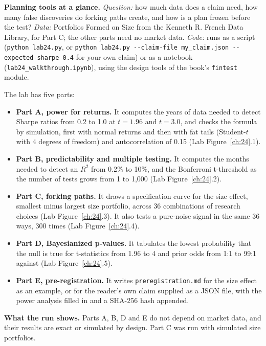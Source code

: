 \begin{callout}
\textbf{Planning tools at a glance.} \emph{Question:} how much data does a claim need, how many false discoveries do forking paths create, and how is a plan frozen before the test? \emph{Data:} Portfolios Formed on Size from the Kenneth R. French Data Library, for Part C; the other parts need no market data. \emph{Code:} runs as a script (\texttt{python lab24.py}, or \texttt{python lab24.py -{}-claim-file my\_claim.json -{}-expected-sharpe 0.4} for your own claim) or as a notebook (\texttt{lab24\_walkthrough.ipynb}), using the design tools of the book's \texttt{fintest} module.
\end{callout}

The lab has five parts:

\begin{itemize}
  \item \textbf{Part A, power for returns.} It computes the years of data needed to detect Sharpe ratios from 0.2 to 1.0 at $t = 1.96$ and $t = 3.0$, and checks the formula by simulation, first with normal returns and then with fat tails (Student-$t$ with 4 degrees of freedom) and autocorrelation of 0.15 (Lab Figure~\ref{ch:24}.1).
  \item \textbf{Part B, predictability and multiple testing.} It computes the months needed to detect an $R^2$ from 0.2\% to 10\%, and the Bonferroni t-threshold as the number of tests grows from 1 to 1,000 (Lab Figure~\ref{ch:24}.2).
  \item \textbf{Part C, forking paths.} It draws a specification curve for the size effect, smallest minus largest size portfolio, across 36 combinations of research choices (Lab Figure~\ref{ch:24}.3). It also tests a pure-noise signal in the same 36 ways, 300 times (Lab Figure~\ref{ch:24}.4).
  \item \textbf{Part D, Bayesianized p-values.} It tabulates the lowest probability that the null is true for t-statistics from 1.96 to 4 and prior odds from 1:1 to 99:1 against (Lab Figure~\ref{ch:24}.5).
  \item \textbf{Part E, pre-registration.} It writes \texttt{preregistration.md} for the size effect as an example, or for the reader's own claim supplied as a JSON file, with the power analysis filled in and a SHA-256 hash appended.
\end{itemize}

\textbf{What the run shows.} Parts A, B, D and E do not depend on market data, and their results are exact or simulated by design. Part C was run with simulated size portfolios.

